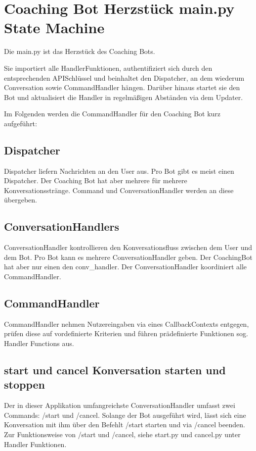     \section{Coaching Bot Herzstück \- main.py \- State Machine}
        Die main.py ist das Herzstück des Coaching Bots.

        Sie importiert alle Handler\-Funktionen, authentifiziert sich durch den entsprechenden API\-Schlüssel und beinhaltet den Dispatcher, an dem wiederum Conversation\- sowie CommandHandler hängen. Darüber hinaus startet sie den Bot und aktualisiert die Handler in regelmäßigen Abständen via dem Updater.

        Im Folgenden werden die CommandHandler für den Coaching Bot kurz aufgeführt:
        
        \subsection{Dispatcher}
            Dispatcher liefern Nachrichten an den User aus. Pro Bot gibt es meist einen Dispatcher. Der Coaching Bot hat aber mehrere für mehrere Konversationsstränge. Command\- und ConversationHandler werden an diese übergeben.


        \subsection{ConversationHandlers}
            ConversationHandler kontrollieren den Konversationsfluss zwischen dem User und dem Bot. Pro Bot kann es mehrere ConversationHandler geben. Der CoachingBot hat aber nur einen \- den conv\_handler. Der ConversationHandler koordiniert alle CommandHandler.


        \subsection{CommandHandler}
            CommandHandler nehmen Nutzereingaben via eines CallbackContexts entgegen, prüfen diese auf vordefinierte Kriterien und führen prädefinierte Funktionen \- sog. Handler Functions aus.


        \subsection{start und cancel \- Konversation starten und stoppen}
            Der in dieser Applikation umfangreichste ConversationHandler umfasst zwei Commands: /start und /cancel. Solange der Bot ausgeführt wird, lässt sich eine Konversation mit ihm über den Befehlt /start starten und via /cancel beenden. Zur Funktionsweise von /start und /cancel, siehe start.py und cancel.py unter Handler Funktionen. 



